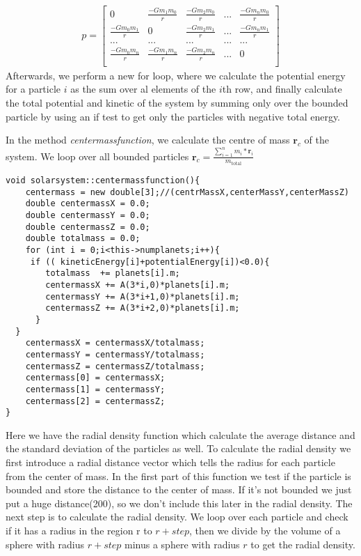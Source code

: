 \documentclass[10pt,a4paper]{article}
\begin{document}
\begin{align}
p=
\begin{bmatrix}
0 & \frac{-Gm_1m_0}{r} & \frac{-Gm_2m_0}{r} & ... & \frac{-Gm_nm_0}{r}  \\
\frac{-Gm_0m_1}{r} & 0 & \frac{-Gm_2m_1}{r} & ... & \frac{-Gm_nm_1}{r}  \\
... & ... & ... & ... & ... \\
\frac{-Gm_0m_n}{r} & \frac{-Gm_1m_n}{r} & \frac{-Gm_2m_n}{r} & ... & 0  \\
\end{bmatrix}
\end{align} 
Afterwards, we perform a new for loop, where we calculate the potential energy for a particle $i$ as the sum over al elements of the $i$th row, and finally calculate the total potential and kinetic of the system by summing only over the bounded particle by using an if test to get only the particles with negative total energy.

In the method \emph{centermassfunction}, we calculate the centre of mass $\mathbf{r}_c$ of the system. We loop over all bounded particles $\mathbf{r}_c = \frac{\sum\limits_{i=1}^n m_i*\mathbf{r}_i}{m_\mathrm{total}}$
\begin{lstlisting} 
void solarsystem::centermassfunction(){
    centermass = new double[3];//(centrMassX,centerMassY,centerMassZ)
    double centermassX = 0.0;
    double centermassY = 0.0;
    double centermassZ = 0.0;
    double totalmass = 0.0;
    for (int i = 0;i<this->numplanets;i++){
     if (( kineticEnergy[i]+potentialEnergy[i])<0.0){
        totalmass  += planets[i].m;
        centermassX += A(3*i,0)*planets[i].m;
        centermassY += A(3*i+1,0)*planets[i].m;
        centermassZ += A(3*i+2,0)*planets[i].m;
      }
  }
    centermassX = centermassX/totalmass;
    centermassY = centermassY/totalmass;
    centermassZ = centermassZ/totalmass;
    centermass[0] = centermassX;
    centermass[1] = centermassY;
    centermass[2] = centermassZ;
}
\end{lstlisting}

Here we have the radial density function which calculate the average distance and the standard deviation of the particles as well. To calculate the radial density we first introduce a radial distance vector which tells the radius for each particle from the center of mass. In the first part of this function we test if the particle is bounded and store the distance to the center of mass. If it's not bounded we just put a huge distance(200), so we don't include this later in the radial density. The next step is to calculate the radial density. We loop over each particle and check if it has a radius in the region r to $r + step$, then we divide by the volume of a sphere with radius $r + step$ minus a sphere with radius $r$ to get the radial density.  
     
\end{document}

